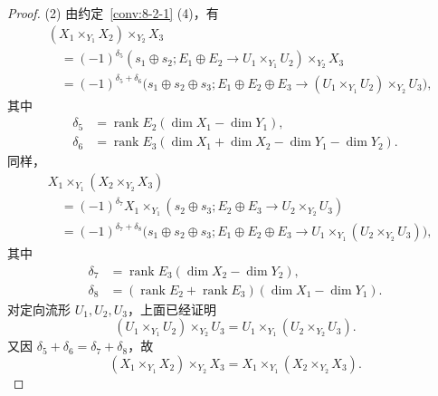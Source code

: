 \begin{proof}
\textup{(2)} 由约定~\ref{conv:8-2-1} (4)，有
\[
\begin{aligned}
 &(X_1\times_{Y_1}X_2)\times_{Y_2}X_3\\
 &\quad=(-1)^{\delta_5}
 (s_1\oplus s_2;E_1\oplus E_2\to U_1\times_{Y_1}U_2)
 \times_{Y_2}X_3\\
 &\quad=(-1)^{\delta_5+\delta_6}
 \bigl(s_1\oplus s_2\oplus s_3;
 E_1\oplus E_2\oplus E_3
 \to(U_1\times_{Y_1}U_2)\times_{Y_2}U_3\bigr),
\end{aligned}
\]
其中
\[
\begin{aligned}
 \delta_5&=\operatorname{rank}E_2(\dim X_1-\dim Y_1),\\
 \delta_6&=\operatorname{rank}E_3
 (\dim X_1+\dim X_2-\dim Y_1-\dim Y_2).
\end{aligned}
\]
同样，
\[
\begin{aligned}
 &X_1\times_{Y_1}(X_2\times_{Y_2}X_3)\\
 &\quad=(-1)^{\delta_7}X_1\times_{Y_1}
 (s_2\oplus s_3;E_2\oplus E_3\to U_2\times_{Y_2}U_3)\\
 &\quad=(-1)^{\delta_7+\delta_8}
 \bigl(s_1\oplus s_2\oplus s_3;
 E_1\oplus E_2\oplus E_3
 \to U_1\times_{Y_1}(U_2\times_{Y_2}U_3)\bigr),
\end{aligned}
\]
其中
\[
\begin{aligned}
 \delta_7&=\operatorname{rank}E_3(\dim X_2-\dim Y_2),\\
 \delta_8&=(\operatorname{rank}E_2+\operatorname{rank}E_3)
 (\dim X_1-\dim Y_1).
\end{aligned}
\]
对定向流形 $U_1,U_2,U_3$，上面已经证明
\[
 (U_1\times_{Y_1}U_2)\times_{Y_2}U_3
 =U_1\times_{Y_1}(U_2\times_{Y_2}U_3).
\]
又因 $\delta_5+\delta_6=\delta_7+\delta_8$，故
\[
 (X_1\times_{Y_1}X_2)\times_{Y_2}X_3
 =X_1\times_{Y_1}(X_2\times_{Y_2}X_3).
\]


\end{proof}
